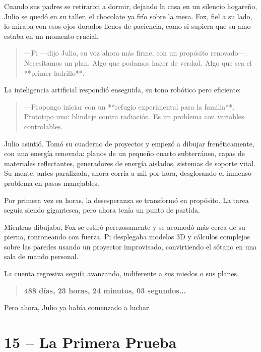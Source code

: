 \documentclass[a4paper,12pt]{book}
\begin{document}
Cuando sus padres se retiraron a dormir, dejando la casa en un silencio hogareño, Julio se quedó en su taller, el chocolate ya frío sobre la mesa. Fox, fiel a su lado, lo miraba con esos ojos dorados llenos de paciencia, como si supiera que su amo estaba en un momento crucial.

\begin{quote}
    —Pi —dijo Julio, su voz ahora más firme, con un propósito renovado—. Necesitamos un plan. Algo que podamos hacer de verdad. Algo que sea el **primer ladrillo**.
\end{quote}

La inteligencia artificial respondió enseguida, su tono robótico pero eficiente:

\begin{quote}
    —Propongo iniciar con un **refugio experimental para la familia**. Prototipo uno: blindaje contra radiación. Es un problema con variables controlables.
\end{quote}

Julio asintió. Tomó su cuaderno de proyectos y empezó a dibujar frenéticamente, con una energía renovada: planos de un pequeño cuarto subterráneo, capas de materiales reflectantes, generadores de energía aislados, sistemas de soporte vital. Su mente, antes paralizada, ahora corría a mil por hora, desglosando el inmenso problema en pasos manejables.

Por primera vez en horas, la desesperanza se transformó en propósito. La tarea seguía siendo gigantesca, pero ahora tenía un punto de partida.

Mientras dibujaba, Fox se estiró perezosamente y se acomodó más cerca de su pierna, ronroneando con fuerza. Pi desplegaba modelos 3D y cálculos complejos sobre las paredes usando un proyector improvisado, convirtiendo el sótano en una sala de mando personal.

La cuenta regresiva seguía avanzando, indiferente a sus miedos o sus planes.

\begin{quote}
    \textbf{488 días, 23 horas, 24 minutos, 03 segundos...}
\end{quote}

Pero ahora, Julio ya había comenzado a luchar.

\cleardoublepage %

\chapter*{15 – La Primera Prueba}
\end{document}
